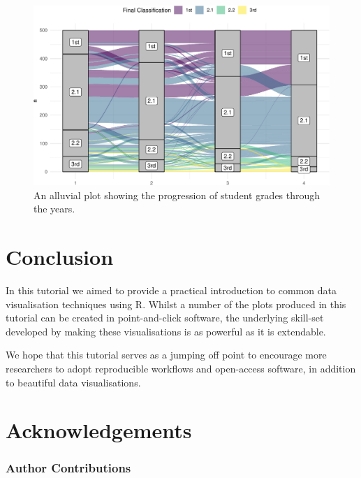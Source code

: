 \documentclass[
  english,
  doc,floatsintext]{apa6}
\begin{document}
\begin{figure}

{\centering \includegraphics[width=1\linewidth]{images/alluvial-1} 

}

\caption{An alluvial plot showing the progression of student grades through the years.}\label{fig:alluvial}
\end{figure}

\hypertarget{conclusion}{%
\section{Conclusion}\label{conclusion}}

In this tutorial we aimed to provide a practical introduction to common data visualisation techniques using R. Whilst a number of the plots produced in this tutorial can be created in point-and-click software, the underlying skill-set developed by making these visualisations is as powerful as it is extendable.

We hope that this tutorial serves as a jumping off point to encourage more researchers to adopt reproducible workflows and open-access software, in addition to beautiful data visualisations.

\hypertarget{acknowledgements}{%
\section{Acknowledgements}\label{acknowledgements}}

\hypertarget{author-contributions}{%
\subsubsection{Author Contributions}\label{author-contributions}}
\end{document}
